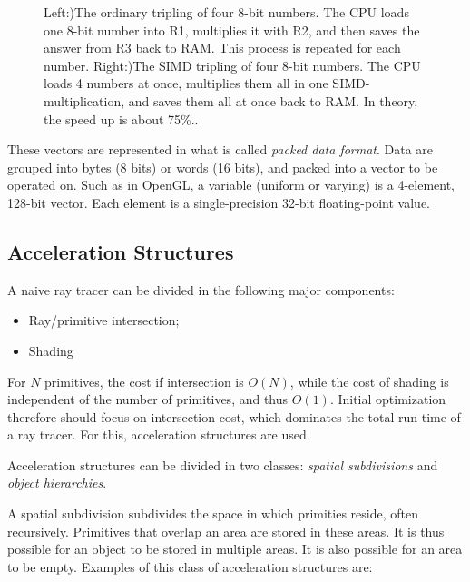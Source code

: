 \begin{figure}
\begin{center}
\begin{subfigure}[b]{0.48\textwidth}
		\end{subfigure}
	\end{center}
	\caption{Left:)The ordinary tripling of four 8-bit numbers. The CPU loads one 8-bit number into R1, multiplies it with R2, and then saves the answer from R3 back to RAM. This process is repeated for each number. Right:)The SIMD tripling of four 8-bit numbers. The CPU loads 4 numbers at once, multiplies them all in one SIMD-multiplication, and saves them all at once back to RAM. In theory, the speed up is about 75\%..}
\end{figure}

These vectors are represented in what is called \textit{packed data format}. Data are grouped into bytes (8 bits) or words (16 bits), and packed into a vector to be operated on. Such as in OpenGL, a variable (uniform or varying) is a 4-element, 128-bit vector. Each element is a single-precision 32-bit floating-point value.   



\subsection{Acceleration Structures}
A naive ray tracer can be divided in the following major components:

\begin{itemize}
	\item Ray/primitive intersection;
	\item Shading
\end{itemize}

For $N$ primitives, the cost if intersection is $O(N)$, while the cost of shading is independent of the number of primitives, and thus $O(1)$. Initial optimization therefore should focus on intersection cost, which dominates the total run-time of a ray tracer. For this, acceleration structures are used.

Acceleration structures can be divided in two classes: \textit{spatial subdivisions} and \textit{object hierarchies}.

A spatial subdivision subdivides the space in which primities reside, often recursively. Primitives that overlap an area are stored in these areas. It is thus possible for an object to be stored in multiple areas. It is also possible for an area to be empty. Examples of this class of acceleration structures are:

